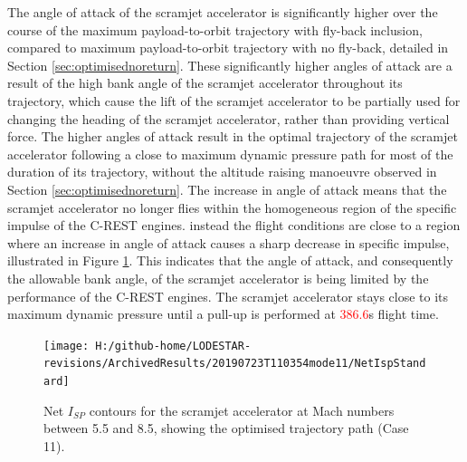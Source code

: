 The angle of attack of the scramjet accelerator is significantly higher over the course of the maximum payload-to-orbit trajectory with fly-back inclusion, compared to maximum payload-to-orbit trajectory with no fly-back, detailed in Section \ref{sec:optimisednoreturn}. These significantly  higher angles of attack are a result of the high bank angle of the scramjet accelerator throughout its trajectory, which cause the lift of the scramjet accelerator to be partially used for changing the heading of the scramjet accelerator, rather than providing vertical force. 
 The higher angles of attack result in the optimal trajectory of the scramjet accelerator following a close to maximum dynamic pressure path for most of the duration of its trajectory, without the altitude raising manoeuvre observed in Section \ref{sec:optimisednoreturn}.
 The increase in angle of attack means that the scramjet accelerator no longer flies within the homogeneous region of the specific impulse of the C-REST engines. instead the flight conditions are close to a region where an increase in angle of attack causes a sharp decrease in specific impulse, illustrated in Figure \ref{fig:NetIspStandard}. 
This indicates that the angle of attack, and consequently the allowable bank angle, of the scramjet accelerator is being limited by the performance of the C-REST engines. 
 The scramjet accelerator stays close to its maximum dynamic pressure until a pull-up is performed at \textcolor{red}{386.6}s flight time. 
 \begin{figure}[!ht]%
 	\centering
 	\texttt{[image: H:/github-home/LODESTAR-revisions/ArchivedResults/20190723T110354mode11/NetIspStandard]}
 	\caption{Net $I_{SP}$ contours for the scramjet accelerator at Mach numbers between 5.5 and 8.5, showing the optimised trajectory path (Case 11). }
 	\label{fig:NetIspStandard}
 \end{figure}

